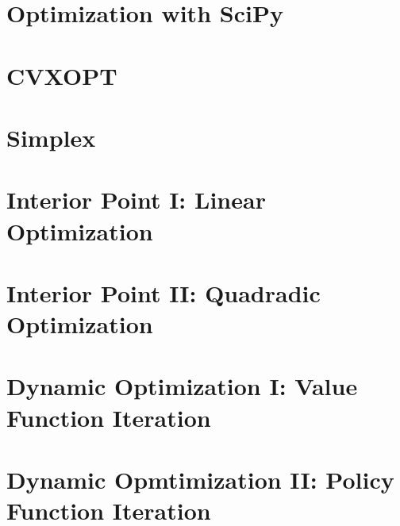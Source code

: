 
\section*{Optimization with SciPy} %





\section*{CVXOPT} %

\section*{Simplex} %

\section*{Interior Point I: Linear Optimization} %

\section*{Interior Point II: Quadradic Optimization} %

\section*{Dynamic Optimization I: Value Function Iteration} %

\section*{Dynamic Opmtimization II: Policy Function Iteration} %
